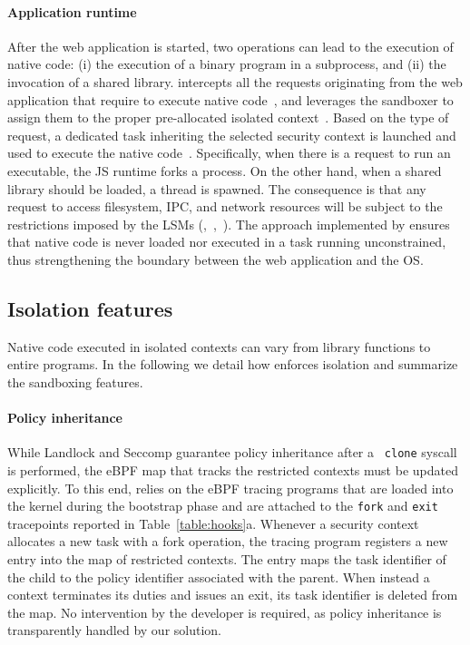 \paragraph{Application runtime}
After the web application is started, two operations can lead to the
execution of native code: (i) the execution of a binary program in a
subprocess, and (ii) the invocation of a shared library. \pap
intercepts all the requests originating from the web application that
require to execute native code~, and leverages the
sandboxer to assign them to the proper pre-allocated isolated
context~. Based on the type of request, a dedicated
task inheriting the selected security context is launched and
used to execute the native code~.
Specifically, when there is a request to run an executable,
the JS runtime forks a process. On the other hand, when a shared
library should be loaded, a thread is spawned. The consequence is
that any request to access filesystem, IPC, and network resources will
be subject to the restrictions imposed by the LSMs
(,~,~). The approach
implemented by \pap ensures that native code is never loaded nor
executed in a task running unconstrained, thus strengthening the
boundary between the web application and the OS.

\subsection{Isolation features}
\label{subsect:isolation}

Native code executed in isolated contexts can vary from library
functions to entire programs. In the following we detail how \pap
enforces isolation and summarize the sandboxing features.

\paragraph{Policy inheritance}
While Landlock and Seccomp guarantee policy inheritance after a {\tt
  clone} syscall is performed, the eBPF map that tracks the
restricted contexts must be updated explicitly. To this end, \pap
relies on the eBPF tracing programs that are loaded into the
kernel during the bootstrap phase and are attached to the {\tt fork}
and {\tt exit} tracepoints reported in
Table~\ref{table:hooks}a. Whenever a security context allocates a new
task with a fork operation, the tracing program registers
a new entry into the map of restricted contexts. The entry
  maps the task identifier of the child to the policy identifier
  associated with the parent. When instead a context terminates its
  duties and issues an exit, its task identifier is deleted from the
  map. No intervention by the developer is required, as policy
inheritance is transparently handled by our solution.

